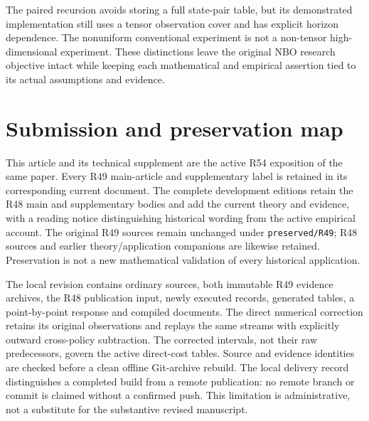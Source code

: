 \documentclass[ecta,nameyear,draft]{econsocart}
\begin{document}
The paired recursion avoids storing a full state-pair table, but its demonstrated implementation still uses a tensor observation cover and has explicit horizon dependence. The nonuniform conventional experiment is not a non-tensor high-dimensional experiment. These distinctions leave the original NBO research objective intact while keeping each mathematical and empirical assertion tied to its actual assumptions and evidence.

\appendix
\section{Submission and preservation map}\label{sec:map49}
This article and its technical supplement are the active R54 exposition of the same paper. Every R49 main-article and supplementary label is retained in its corresponding current document. The complete development editions retain the R48 main and supplementary bodies and add the current theory and evidence, with a reading notice distinguishing historical wording from the active empirical account. The original R49 sources remain unchanged under \texttt{preserved/R49}; R48 sources and earlier theory/application companions are likewise retained. Preservation is not a new mathematical validation of every historical application.

The local revision contains ordinary sources, both immutable R49 evidence archives, the R48 publication input, newly executed records, generated tables, a point-by-point response and compiled documents. The direct numerical correction retains its original observations and replays the same streams with explicitly outward cross-policy subtraction. The corrected intervals, not their raw predecessors, govern the active direct-cost tables. Source and evidence identities are checked before a clean offline Git-archive rebuild. The local delivery record distinguishes a completed build from a remote publication: no remote branch or commit is claimed without a confirmed push. This limitation is administrative, not a substitute for the substantive revised manuscript.



\end{document}
